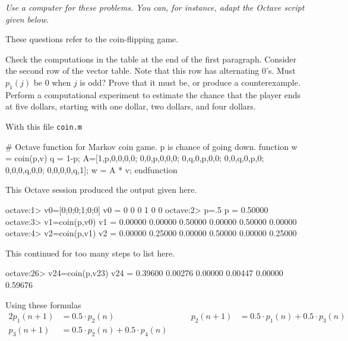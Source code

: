 \begin{exercises}
  \item[]\textit{Use a computer for these problems.
    You can, for instance, adapt the Octave script given below.}
  \item 
    These questions refer to the coin-flipping game.
    \begin{exparts}
     \partsitem Check the computations in the table at the end of the
       first paragraph.
     \partsitem Consider the second row of the vector table.
       Note that this row has alternating $0$'s.  
       Must $p_{1}(j)$ be $0$ when $j$ is odd?
       Prove that it must be, or produce a counterexample.
     \partsitem Perform a computational experiment to estimate
       the chance that the player ends at five dollars, 
       starting with one dollar, two dollars, and four dollars.
    \end{exparts}
    \begin{answer}
      \begin{exparts}
        \partsitem With this file \texttt{coin.m}
\begin{computercode}         
# Octave function for Markov coin game.  p is chance of going down.
function w = coin(p,v)
  q = 1-p;
  A=[1,p,0,0,0,0;
     0,0,p,0,0,0;
     0,q,0,p,0,0;
     0,0,q,0,p,0;
     0,0,0,q,0,0;
     0,0,0,0,q,1];
  w = A * v;
endfunction
\end{computercode}
         This Octave session produced the output given here. 
\begin{computercode}
octave:1> v0=[0;0;0;1;0;0]
v0 =
  0
  0
  0
  1
  0
  0
octave:2> p=.5
p = 0.50000
octave:3> v1=coin(p,v0)
v1 =
  0.00000
  0.00000
  0.50000
  0.00000
  0.50000
  0.00000
octave:4> v2=coin(p,v1)
v2 =
  0.00000
  0.25000
  0.00000
  0.50000
  0.00000
  0.25000
\end{computercode}
This continued for too many steps to list here.
\begin{computercode}
octave:26> v24=coin(p,v23)
v24 =
  0.39600
  0.00276
  0.00000
  0.00447
  0.00000
  0.59676
\end{computercode}        
        \partsitem Using these formulas
          \begin{alignat*}{2}
             p_{1}(n+1) &= 0.5\cdot p_{2}(n)
             &\qquad
             p_{2}(n+1) &= 0.5\cdot p_{1}(n)+0.5\cdot p_{3}(n)
                                                              \\
             p_{3}(n+1) &= 0.5\cdot p_{2}(n)+0.5\cdot p_{4}(n)
             &\qquad

\end{alignat*}
\end{exparts}
\end{answer}
\end{exercises}
